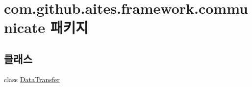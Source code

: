 \hypertarget{namespacecom_1_1github_1_1aites_1_1framework_1_1communicate}{}\section{com.\+github.\+aites.\+framework.\+communicate 패키지}
\label{namespacecom_1_1github_1_1aites_1_1framework_1_1communicate}
\subsection*{클래스}
\begin{DoxyCompactItemize}
\item 
class \mbox{\hyperlink{classcom_1_1github_1_1aites_1_1framework_1_1communicate_1_1_data_transfer}{Data\+Transfer}}
\end{DoxyCompactItemize}
